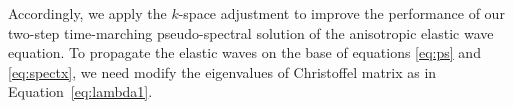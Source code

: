 Accordingly, we apply the $k$-space adjustment to improve the performance of our two-step time-marching
pseudo-spectral solution of the anisotropic elastic wave equation.
To propagate the elastic waves on the base of equations \ref{eq:ps} and
\ref{eq:spectx},
we need modify the eigenvalues of Christoffel matrix as in Equation~\ref{eq:lambda1}.


\newpage
 

